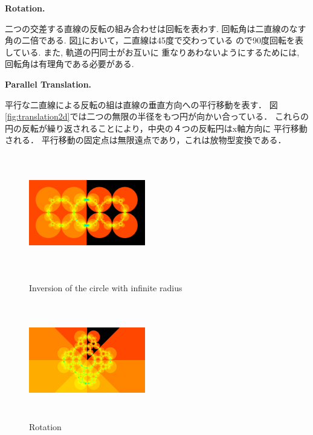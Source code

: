 \noindent\textbf{Rotation.}

二つの交差する直線の反転の組み合わせは回転を表わす. 回転角は二直線のなす
角の二倍である. 図\ref{fig:rotation}において，二直線は45度で交わっている
ので90度回転を表している. また, 軌道の円同士がお互いに
重なりあわないようにするためには, 回転角は有理角である必要がある.

\noindent\textbf{Parallel Translation.}

平行な二直線による反転の組は直線の垂直方向への平行移動を表す．
図\ref{fig:translation2d}では二つの無限の半径をもつ円が向かい合っている．
これらの円の反転が繰り返されることにより，中央の４つの反転円はx軸方向に
平行移動される．
平行移動の固定点は無限遠点であり，これは放物型変換である．

\begin{figure}[h!tbp]
 \begin{minipage}[t]{0.3\hsize}
  \center
   \includegraphics[width=2in, height=2in, keepaspectratio]{../img/klein/2diis/infCircle.pdf}
  \caption{Inversion of the circle with infinite radius}
  \label{fig:infCircle}
 \end{minipage}
 \hspace*{\fill}
 \begin{minipage}[t]{0.3\hsize}
  \center
  \includegraphics[width=2in, height=2in, keepaspectratio]{../img/klein/2diis/rotation.pdf}
  \caption{Rotation}
  \label{fig:rotation}
 \end{minipage}
 \hspace*{\fill}
 \begin{minipage}[t]{0.3\hsize}

\end{minipage}
\end{figure}
